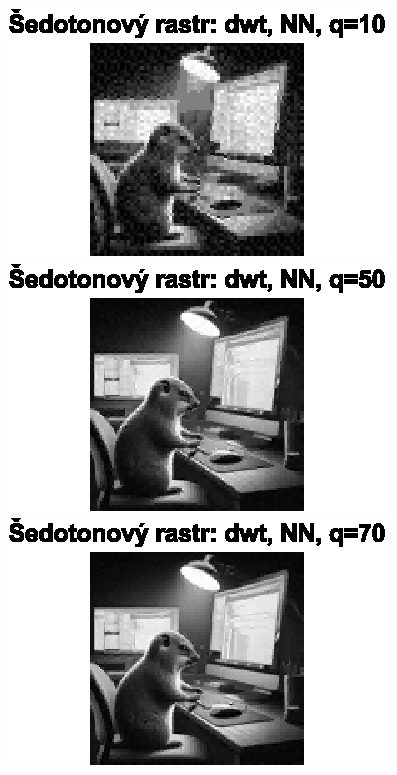 \begin{figure}[H]
    \centering
    \begin{minipage}[b]{0.3\textwidth}
        \centering
        \includegraphics[width=\textwidth]{images/sedo_dwt_NN_q10.eps}
    \end{minipage}
    \hfill
    \begin{minipage}[b]{0.3\textwidth}
        \centering
        \includegraphics[width=\textwidth]{images/sedo_dwt_NN_q50.eps}
    \end{minipage}
    \hfill
    \begin{minipage}[b]{0.3\textwidth}
        \centering
        \includegraphics[width=\textwidth]{images/sedo_dwt_NN_q70.eps}
    \end{minipage}
\end{figure}

